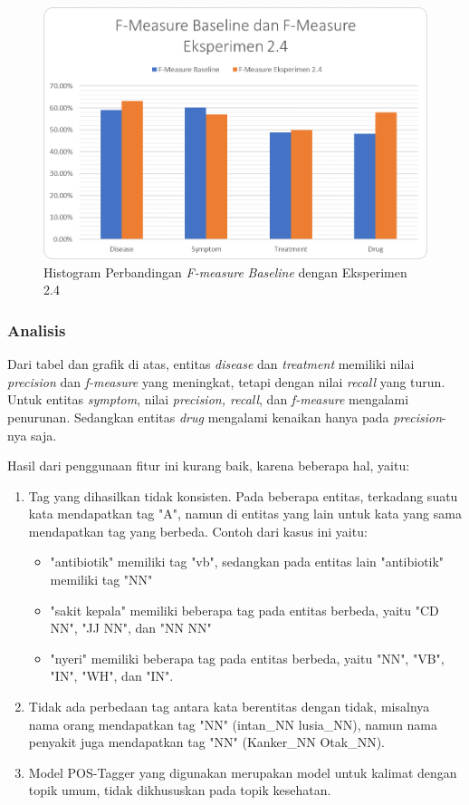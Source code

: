 	\begin{figure}
		\centering
		\includegraphics[width=0.85\linewidth]{images/histogram4}
		\caption{Histogram Perbandingan \textit{F-measure} \textit{Baseline} dengan Eksperimen 2.4}
		\label{fig:owndict4}
	\end{figure}
	
	\subsubsection{Analisis}
	Dari tabel dan grafik di atas, entitas \textit{disease} dan \textit{treatment} memiliki nilai \textit{precision} dan \textit{f-measure} yang meningkat, tetapi dengan nilai \textit{recall} yang turun. Untuk entitas \textit{symptom}, nilai \textit{precision, recall}, dan \textit{f-measure} mengalami penurunan. Sedangkan entitas \textit{drug} mengalami kenaikan hanya pada \textit{precision}-nya saja.
	
	Hasil dari penggunaan fitur ini kurang baik, karena beberapa hal, yaitu:
	\begin{enumerate}
		\item Tag yang dihasilkan tidak konsisten. Pada beberapa entitas, terkadang suatu kata mendapatkan tag "A", namun di entitas yang lain untuk kata yang sama mendapatkan tag yang berbeda. Contoh dari kasus ini yaitu:
		\begin{itemize}
			\item "antibiotik" memiliki tag "vb", sedangkan pada entitas lain "antibiotik" memiliki tag "NN"
			\item "sakit kepala" memiliki beberapa tag pada entitas berbeda, yaitu "CD NN", "JJ NN", dan "NN NN"
			\item "nyeri" memiliki beberapa tag pada entitas berbeda, yaitu "NN", "VB", "IN", "WH", dan "IN".
		\end{itemize}
		\item Tidak ada perbedaan tag antara kata berentitas dengan tidak, misalnya nama orang mendapatkan tag "NN" (intan\_NN lusia\_NN), namun nama penyakit juga mendapatkan tag "NN" (Kanker\_NN Otak\_NN).
		\item Model POS-Tagger yang digunakan merupakan model untuk kalimat dengan topik umum, tidak dikhususkan pada topik kesehatan.
	\end{enumerate}
	
